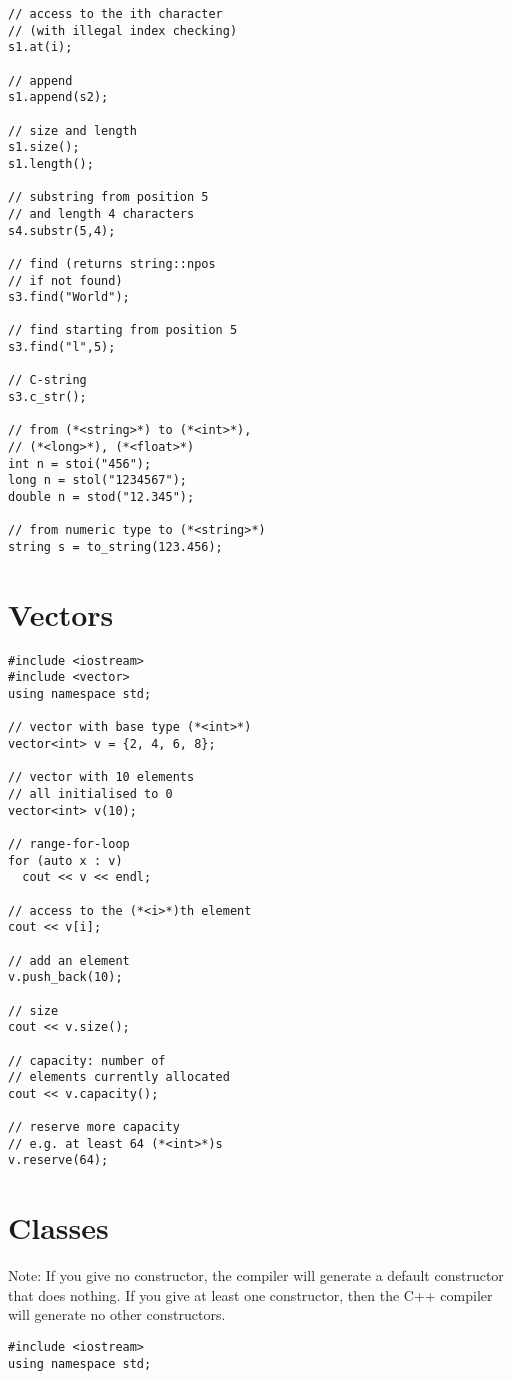 \documentclass[10pt]{article}
\begin{document}
\begin{multicols*}{3}
\begin{lstlisting}
// access to the ith character
// (with illegal index checking)
s1.at(i);

// append
s1.append(s2);

// size and length
s1.size();
s1.length();

// substring from position 5
// and length 4 characters
s4.substr(5,4);

// find (returns string::npos
// if not found)
s3.find("World");

// find starting from position 5
s3.find("l",5);

// C-string
s3.c_str();

// from (*<string>*) to (*<int>*),
// (*<long>*), (*<float>*)
int n = stoi("456");
long n = stol("1234567");
double n = stod("12.345");

// from numeric type to (*<string>*)
string s = to_string(123.456);
\end{lstlisting}
%
%
\section*{Vectors}
\small
\lstset {language=C++}
\begin{lstlisting}
#include <iostream>
#include <vector>
using namespace std;

// vector with base type (*<int>*)
vector<int> v = {2, 4, 6, 8};

// vector with 10 elements
// all initialised to 0
vector<int> v(10);

// range-for-loop
for (auto x : v)
  cout << v << endl;

// access to the (*<i>*)th element
cout << v[i];

// add an element
v.push_back(10);

// size
cout << v.size();

// capacity: number of 
// elements currently allocated
cout << v.capacity();

// reserve more capacity
// e.g. at least 64 (*<int>*)s
v.reserve(64);
\end{lstlisting}
%
%
\section*{Classes}
\small
Note: If you give no constructor, the compiler will generate a default constructor that does nothing.
If you give at least one constructor, then the C++ compiler will generate no other constructors.
\lstset {language=C++}
\begin{lstlisting}
#include <iostream>
using namespace std;


\end{lstlisting}
\end{multicols*}
\end{document}
